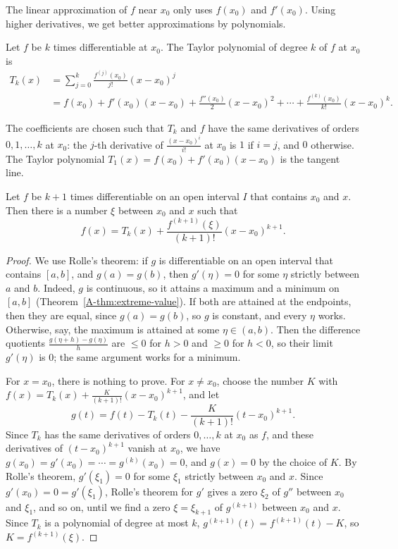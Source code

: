 The linear approximation of $f$ near $x_0$ only uses $f(x_0)$ and $f'(x_0)$. Using higher derivatives, we get better approximations by polynomials.

\begin{definition}\label{L3-def:taylor-polynomial}
    Let $f$ be $k$ times differentiable at $x_0$. The Taylor polynomial of degree $k$ of $f$ at $x_0$ is
    \begin{align*}
        T_k(x) &= \sum_{j=0}^k \frac{f^{(j)}(x_0)}{j!} (x - x_0)^j \\
        &= f(x_0) + f'(x_0)(x - x_0) + \frac{f''(x_0)}{2}(x - x_0)^2 + \cdots + \frac{f^{(k)}(x_0)}{k!}(x - x_0)^k.
    \end{align*}
\end{definition}

The coefficients are chosen such that $T_k$ and $f$ have the same derivatives of orders $0, 1, \ldots, k$ at $x_0$: the $j$-th derivative of $\frac{(x - x_0)^i}{i!}$ at $x_0$ is $1$ if $i = j$, and $0$ otherwise. The Taylor polynomial $T_1(x) = f(x_0) + f'(x_0)(x - x_0)$ is the tangent line.

\begin{theorem}\label{L3-thm:taylor-1d}
    Let $f$ be $k + 1$ times differentiable on an open interval $I$ that contains $x_0$ and $x$. Then there is a number $\xi$ between $x_0$ and $x$ such that
    \[f(x) = T_k(x) + \frac{f^{(k+1)}(\xi)}{(k+1)!} (x - x_0)^{k+1}.\]
\end{theorem}

\begin{proof}
    We use Rolle's theorem: if $g$ is differentiable on an open interval that contains $[a, b]$, and $g(a) = g(b)$, then $g'(\eta) = 0$ for some $\eta$ strictly between $a$ and $b$. Indeed, $g$ is continuous, so it attains a maximum and a minimum on $[a, b]$ (Theorem~\ref{A-thm:extreme-value}). If both are attained at the endpoints, then they are equal, since $g(a) = g(b)$, so $g$ is constant, and every $\eta$ works. Otherwise, say, the maximum is attained at some $\eta \in (a, b)$. Then the difference quotients $\frac{g(\eta + h) - g(\eta)}{h}$ are $\leq 0$ for $h > 0$ and $\geq 0$ for $h < 0$, so their limit $g'(\eta)$ is $0$; the same argument works for a minimum.

    For $x = x_0$, there is nothing to prove. For $x \neq x_0$, choose the number $K$ with $f(x) = T_k(x) + \frac{K}{(k+1)!}(x - x_0)^{k+1}$, and let
    \[g(t) = f(t) - T_k(t) - \frac{K}{(k+1)!}(t - x_0)^{k+1}.\]
    Since $T_k$ has the same derivatives of orders $0, \ldots, k$ at $x_0$ as $f$, and these derivatives of $(t - x_0)^{k+1}$ vanish at $x_0$, we have $g(x_0) = g'(x_0) = \cdots = g^{(k)}(x_0) = 0$, and $g(x) = 0$ by the choice of $K$. By Rolle's theorem, $g'(\xi_1) = 0$ for some $\xi_1$ strictly between $x_0$ and $x$. Since $g'(x_0) = 0 = g'(\xi_1)$, Rolle's theorem for $g'$ gives a zero $\xi_2$ of $g''$ between $x_0$ and $\xi_1$, and so on, until we find a zero $\xi = \xi_{k+1}$ of $g^{(k+1)}$ between $x_0$ and $x$. Since $T_k$ is a polynomial of degree at most $k$, $g^{(k+1)}(t) = f^{(k+1)}(t) - K$, so $K = f^{(k+1)}(\xi)$.
\end{proof}

